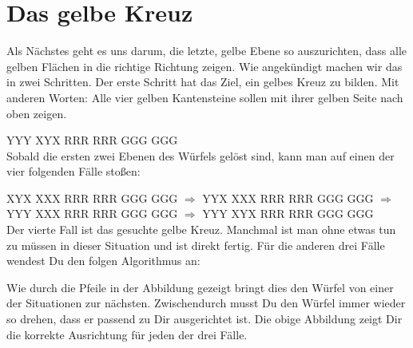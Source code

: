 \section{Das gelbe Kreuz}
\parbox{0.7\linewidth}{
  Als Nächstes geht es uns darum, die letzte, gelbe Ebene so auszurichten, dass alle gelben Flächen in die richtige Richtung zeigen. 
  Wie angekündigt machen wir das in zwei Schritten.
  Der erste Schritt hat das Ziel, ein gelbes Kreuz zu bilden.
  Mit anderen Worten: Alle vier gelben Kantensteine sollen mit ihrer gelben Seite nach oben zeigen.
}
\RubikCubeGreyAll%
            {Y}{Y}{Y}
            {X}{Y}{X}%
               {R}{R}{R}
	       {R}{R}{R}%
	       {G}{G}{G}
	       {G}{G}{G}%
\\[1em]

Sobald die ersten zwei Ebenen des Würfels gelöst sind, kann man auf einen der vier folgenden Fälle stoßen:

\RubikCubeGreyAll%
            {X}{Y}{X}
            {X}{X}{X}%
               {R}{R}{R}
	       {R}{R}{R}%
	       {G}{G}{G}
	       {G}{G}{G}%
$\Longrightarrow$
\RubikCubeGreyAll%
            {Y}{Y}{X}
            {X}{X}{X}%
               {R}{R}{R}
	       {R}{R}{R}%
	       {G}{G}{G}
	       {G}{G}{G}%
$\Longrightarrow$
\RubikCubeGreyAll%
            {Y}{Y}{Y}
            {X}{X}{X}%
               {R}{R}{R}
	       {R}{R}{R}%
	       {G}{G}{G}
	       {G}{G}{G}%
$\Longrightarrow$
\RubikCubeGreyAll%
            {Y}{Y}{Y}
            {X}{Y}{X}%
               {R}{R}{R}
	       {R}{R}{R}%
	       {G}{G}{G}
	       {G}{G}{G}%
\\[1em]

Der vierte Fall ist das gesuchte gelbe Kreuz.
Manchmal ist man ohne etwas tun zu müssen in dieser Situation und ist direkt fertig.
Für die anderen drei Fälle wendest Du den folgen Algorithmus an: \\[1em]
\begin{center}
\end{center}

Wie durch die Pfeile in der Abbildung gezeigt bringt dies den Würfel von einer der Situationen zur nächsten.
Zwischendurch musst Du den Würfel immer wieder so drehen, dass er passend zu Dir ausgerichtet ist. 
Die obige Abbildung zeigt Dir die korrekte Ausrichtung für jeden der drei Fälle.
